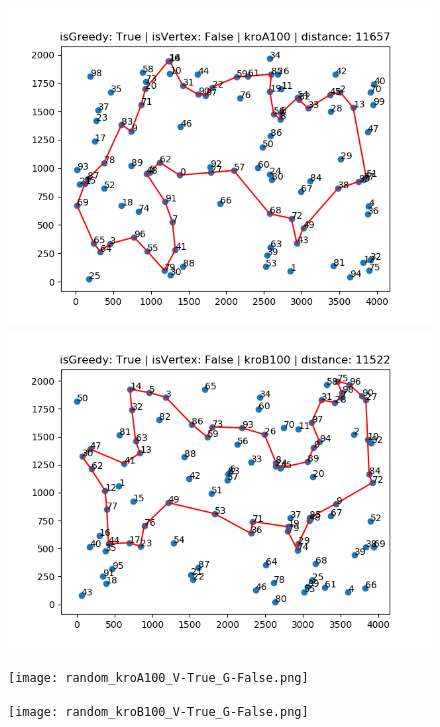 \documentclass{article}
\begin{document}
\begin{figure}[h!]
    \centering
  \begin{minipage}[b]{0.5\textwidth}
    \includegraphics[width=\textwidth]{random_kroA100_V-False_G-True.png}
  \end{minipage}

  \begin{minipage}[b]{0.5\textwidth}
    \includegraphics[width=\textwidth]{random_kroB100_V-False_G-True.png}
  \end{minipage}
\end{figure}

\begin{figure}[h!]
  \centering
  \begin{minipage}[b]{0.5\textwidth}
    \texttt{[image: random\_kroA100\_V-True\_G-False.png]}
  \end{minipage}

  \begin{minipage}[b]{0.5\textwidth}
    \texttt{[image: random\_kroB100\_V-True\_G-False.png]}
  \end{minipage} 
  
\end{figure}
    
\end{document}
